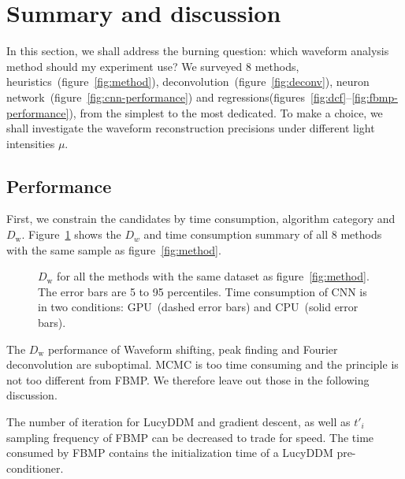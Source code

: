 \section{Summary and discussion}
\label{sec:discussion}

In this section, we shall address the burning question: which waveform analysis method should my experiment use?  We surveyed 8 methods, heuristics~(figure~\ref{fig:method}), deconvolution~(figure~\ref{fig:deconv}), neuron network~(figure~\ref{fig:cnn-performance}) and regressions(figures~\ref{fig:dcf}--\ref{fig:fbmp-performance}), from the simplest to the most dedicated.  To make a choice, we shall investigate the waveform reconstruction precisions under different light intensities $\mu$.

\subsection{Performance}

First, we constrain the candidates by time consumption, algorithm category and $D_\mathrm{w}$.  Figure~\ref{fig:chargesummary} shows the $D_w$ and time consumption summary of all 8 methods with the same sample as figure~\ref{fig:method}.
\begin{figure}[H]
    \centering
    \resizebox{\textwidth}{!}{}
    \caption{\label{fig:chargesummary} $D_\mathrm{w}$ for all the methods with the same dataset as figure~\ref{fig:method}. The error bars are 5 to 95 percentiles. Time consumption of CNN is in two conditions: GPU\protect\footnotemark~(dashed error bars) and CPU\protect\footnotemark~(solid error bars). }
\end{figure}
\addtocounter{footnote}{-2}

The $D_\mathrm{w}$ performance of Waveform shifting, peak finding and Fourier deconvolution are suboptimal.  MCMC is too time consuming and the principle is not too different from FBMP.  We therefore leave out those in the following discussion.

The number of iteration for LucyDDM and gradient descent, as well as $t'_i$ sampling frequency of FBMP can be decreased to trade for speed. The time consumed by FBMP contains the initialization time of a LucyDDM pre-conditioner. 


